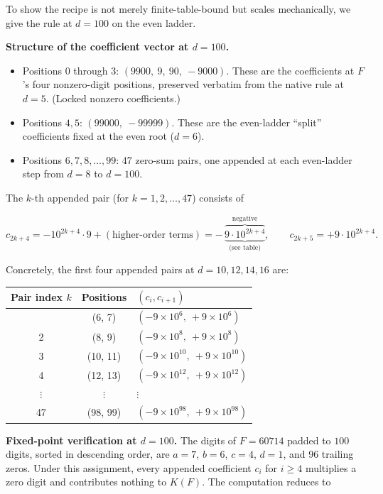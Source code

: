 \documentclass[11pt,letterpaper]{article}
\providecommand{\tightlist}{%
  \setlength{\itemsep}{0pt}\setlength{\parskip}{0pt}}
\theoremstyle{paperstyle}
\theoremstyle{paperstyledef}
\theoremstyle{paperstylerem}
\begin{document}
To show the recipe is not merely finite-table-bound but scales
mechanically, we give the rule at \(d = 100\) on the even ladder.

\textbf{Structure of the coefficient vector at \(d = 100\).}

\begin{itemize}
\tightlist
\item
  Positions \(0\) through \(3\): \((9900,\ 9,\ 90,\ -9000)\). These are
  the coefficients at \(F\)'s four nonzero-digit positions, preserved
  verbatim from the native rule at \(d = 5\). (Locked nonzero
  coefficients.)
\item
  Positions \(4, 5\): \((99000,\ -99999)\). These are the even-ladder
  ``split'' coefficients fixed at the even root (\(d = 6\)).
\item
  Positions \(6, 7, 8, \ldots, 99\): 47 zero-sum pairs, one appended at
  each even-ladder step from \(d = 8\) to \(d = 100\).
\end{itemize}

The \(k\)-th appended pair (for \(k = 1, 2, \ldots, 47\)) consists of

\[c_{2k + 4} = -10^{2k + 4} \cdot 9 + (\text{higher-order terms}) = -\,\underbrace{\overbrace{9 \cdot 10^{2k + 4}}^{\text{negative}}}_{\text{(see table)}}, \qquad c_{2k + 5} = +9 \cdot 10^{2k + 4}.\]

Concretely, the first four appended pairs at \(d = 10, 12, 14, 16\) are:

\begin{longtable}[]{@{}ccl@{}}
\toprule\noalign{}
Pair index \(k\) & Positions & \((c_i, c_{i+1})\) \\
\midrule\noalign{}
\endhead
\bottomrule\noalign{}
\endlastfoot
1 & (6, 7) & \((-9 \times 10^6,\ +9 \times 10^6)\) \\
2 & (8, 9) & \((-9 \times 10^8,\ +9 \times 10^8)\) \\
3 & (10, 11) & \((-9 \times 10^{10},\ +9 \times 10^{10})\) \\
4 & (12, 13) & \((-9 \times 10^{12},\ +9 \times 10^{12})\) \\
\(\vdots\) & \(\vdots\) & \(\vdots\) \\
47 & (98, 99) & \((-9 \times 10^{98},\ +9 \times 10^{98})\) \\
\end{longtable}

\textbf{Fixed-point verification at \(d = 100\).} The digits of
\(F = 60714\) padded to \(100\) digits, sorted in descending order, are
\(a = 7\), \(b = 6\), \(c = 4\), \(d = 1\), and 96 trailing zeros. Under
this assignment, every appended coefficient \(c_i\) for \(i \geq 4\)
multiplies a zero digit and contributes nothing to \(K(F)\). The
computation reduces to
\end{document}
